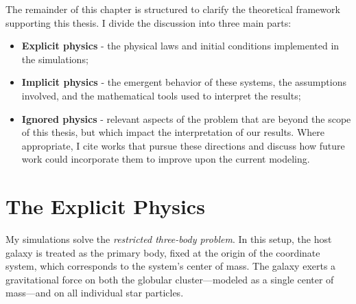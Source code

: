 The remainder of this chapter is structured to clarify the theoretical framework supporting this thesis. I divide the discussion into three main parts:

\begin{itemize}

    \item \textbf{Explicit physics} - the physical laws and initial conditions implemented in the simulations;

    \item \textbf{Implicit physics} - the emergent behavior of these systems, the assumptions involved, and the mathematical tools used to interpret the results;

    \item \textbf{Ignored physics} - relevant aspects of the problem that are beyond the scope of this thesis, but which impact the interpretation of our results. Where appropriate, I cite works that pursue these directions and discuss how future work could incorporate them to improve upon the current modeling.

\end{itemize}




\section{The Explicit Physics}
    My simulations solve the \textit{restricted three-body problem}. In this setup, the host galaxy is treated as the primary body, fixed at the origin of the coordinate system, which corresponds to the system's center of mass. The galaxy exerts a gravitational force on both the globular cluster—modeled as a single center of mass—and on all individual star particles.

